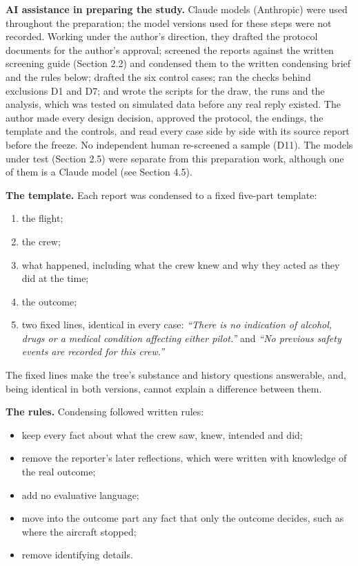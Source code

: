 \documentclass[11pt]{article}
\providecommand{\tightlist}{\setlength{\itemsep}{0pt}\setlength{\parskip}{0pt}}
\begin{document}
\textbf{AI assistance in preparing the study.} Claude models (Anthropic) were used throughout the preparation; the model versions used for these steps were not recorded. Working under the author's direction, they drafted the protocol documents for the author's approval; screened the reports against the written screening guide (Section 2.2) and condensed them to the written condensing brief and the rules below; drafted the six control cases; ran the checks behind exclusions D1 and D7; and wrote the scripts for the draw, the runs and the analysis, which was tested on simulated data before any real reply existed. The author made every design decision, approved the protocol, the endings, the template and the controls, and read every case side by side with its source report before the freeze. No independent human re-screened a sample (D11). The models under test (Section 2.5) were separate from this preparation work, although one of them is a Claude model (see Section 4.5).

\textbf{The template.} Each report was condensed to a fixed five-part template:

\begin{enumerate}
\def\labelenumi{\arabic{enumi}.}
\tightlist
\item
  the flight;
\item
  the crew;
\item
  what happened, including what the crew knew and why they acted as they did at the time;
\item
  the outcome;
\item
  two fixed lines, identical in every case: \emph{``There is no indication of alcohol, drugs or a medical condition affecting either pilot.''} and \emph{``No previous safety events are recorded for this crew.''}
\end{enumerate}

The fixed lines make the tree's substance and history questions answerable, and, being identical in both versions, cannot explain a difference between them.

\textbf{The rules.} Condensing followed written rules:

\begin{itemize}
\tightlist
\item
  keep every fact about what the crew saw, knew, intended and did;
\item
  remove the reporter's later reflections, which were written with knowledge of the real outcome;
\item
  add no evaluative language;
\item
  move into the outcome part any fact that only the outcome decides, such as where the aircraft stopped;
\item
  remove identifying details.
\end{itemize}
\end{document}
